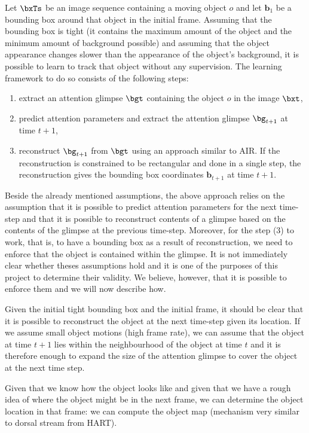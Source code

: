     Let $\bxTs$ be an image sequence containing a moving object $o$ and let $\bm{b}_1$ be a bounding box around that object in the initial frame. Assuming that the bounding box is tight (\ie it contains the maximum amount of the object and the minimum amount of background possible) and assuming that the object appearance changes slower than the appearance of the object's background, it is possible to learn to track that object without any supervision. The learning framework to do so consists of the following steps:
    \begin{enumerate}
        \item extract an attention glimpse $\bgt$ containing the object $o$ in the image $\bxt$,
        \item predict attention parameters and extract the attention glimpse $\bg_{t+1}$ at time $t+1$,
        \item reconstruct $\bg_{t+1}$ from $\bgt$ using an approach similar to AIR. If the reconstruction is constrained to be rectangular and done in a single step, the reconstruction gives the bounding box coordinates $\bm{b}_{t+1}$ at time $t+1$.
    \end{enumerate}
    Beside the already mentioned assumptions, the above approach relies on the assumption that it is possible to predict attention parameters for the next time-step and that it is possible to reconstruct contents of a glimpse based on the contents of the glimpse at the previous time-step. Moreover, for the step (3) to work, that is, to have a bounding box as a result of reconstruction, we need to enforce that the object is contained within the glimpse. It is not immediately clear whether theses assumptions hold and it is one of the purposes of this project to determine their validity. We believe, however, that it is possible to enforce them and we will now describe how.
    
    
    Given the initial tight bounding box and the initial frame, it should be clear that it is possible to reconstruct the object at the next time-step given its location. If we assume small object motions (high frame rate), we can assume that the object at time $t+1$ lies within the neighbourhood of the object at time $t$ and it is therefore enough to expand the size of the attention glimpse to cover the object at the next time step.


    Given that we know how the object looks like and given that we have a rough idea of where the object might be in the next frame, we can determine the object location in that frame: we can compute the object map (mechanism very similar to dorsal stream from HART).
    
